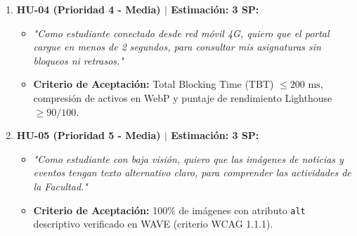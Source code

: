 \documentclass[10pt,a4paper]{article}
\begin{document}
\begin{enumerate}
\begin{itemize}
    \end{itemize}
    \item \textbf{HU-04 (Prioridad 4 - Media) $\vert$ Estimación: 3 SP:}
    \begin{itemize}\footnotesize
        \item \textit{"Como estudiante conectado desde red móvil 4G, quiero que el portal cargue en menos de 2 segundos, para consultar mis asignaturas sin bloqueos ni retrasos."}
        \item \textbf{Criterio de Aceptación:} Total Blocking Time (TBT) $\le 200\text{ ms}$, compresión de activos en WebP y puntaje de rendimiento Lighthouse $\ge 90/100$.
    \end{itemize}
    \item \textbf{HU-05 (Prioridad 5 - Media) $\vert$ Estimación: 3 SP:}
    \begin{itemize}\footnotesize
        \item \textit{"Como estudiante con baja visión, quiero que las imágenes de noticias y eventos tengan texto alternativo claro, para comprender las actividades de la Facultad."}
        \item \textbf{Criterio de Aceptación:} 100\% de imágenes con atributo \texttt{alt} descriptivo verificado en WAVE (criterio WCAG 1.1.1).
    \end{itemize}
\end{enumerate}
\end{document}
